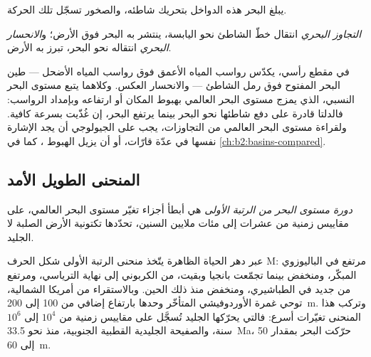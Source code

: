 يبلغ البحر هذه الدواخل بتحريك شاطئه، والصخور تسجّل تلك الحركة.

\begin{definition}\label{def:b2:phanerozoic-earth:transgression}
\emph{التجاوز البحري} انتقال خطّ الشاطئ نحو اليابسة،
ينتشر به البحر فوق الأرض؛ و\emph{الانحسار البحري} انتقاله
نحو البحر، تبرز به الأرض.
\end{definition}

في مقطع رأسي، يكدّس  رواسب المياه الأعمق فوق رواسب المياه الأضحل ---
طين البحر المفتوح فوق رمل الشاطئ --- والانحسار العكس. وكلاهما يتبع مستوى البحر
النسبي، الذي يمزج مستوى البحر العالمي بهبوط المكان أو ارتفاعه وبإمداد
الرواسب: فالدلتا قادرة على دفع شاطئها نحو البحر بينما يرتفع البحر، إن غُذّيت بسرعة
كافية. ولقراءة مستوى البحر العالمي من التجاوزات، يجب على الجيولوجي أن يجد الإشارة نفسها
في عدّة قارّات، أو أن يزيل الهبوط ، كما في
\cref{ch:b2:basins-compared}.

\subsection*{المنحنى الطويل الأمد}

\begin{definition}\label{def:b2:phanerozoic-earth:first-order}
\emph{دورة مستوى البحر من الرتبة الأولى} هي أبطأ أجزاء
تغيّر مستوى البحر العالمي، على مقاييس زمنية من عشرات إلى مئات ملايين السنين، تحدّدها
تكتونية الأرض الصلبة لا الجليد.
\end{definition}

عبر دهر الحياة الظاهرة يتّخذ منحنى الرتبة الأولى شكل الحرف M: مرتفع في الباليوزوي المبكّر،
ومنخفض بينما تجمّعت بانجيا وبقيت، من الكربوني إلى نهاية الترياسي، ومرتفع
من جديد في الطباشيري، ومنخفض منذ ذلك الحين. وبالاستقراء من أمريكا الشمالية، توحي غمرة
الأوردوفيشي المتأخّر وحدها بارتفاع إضافي من 100 إلى \qty{200}{m}.
وتركب هذا المنحنى تغيّرات أسرع: فالتي يحرّكها الجليد تُسجَّل على مقاييس زمنية من $10^4$ إلى
$10^6$ سنة، والصفيحة الجليدية القطبية الجنوبية، منذ نحو \qty{33.5}{Ma}، حرّكت البحر بمقدار 50 إلى
\qty{60}{m}.

